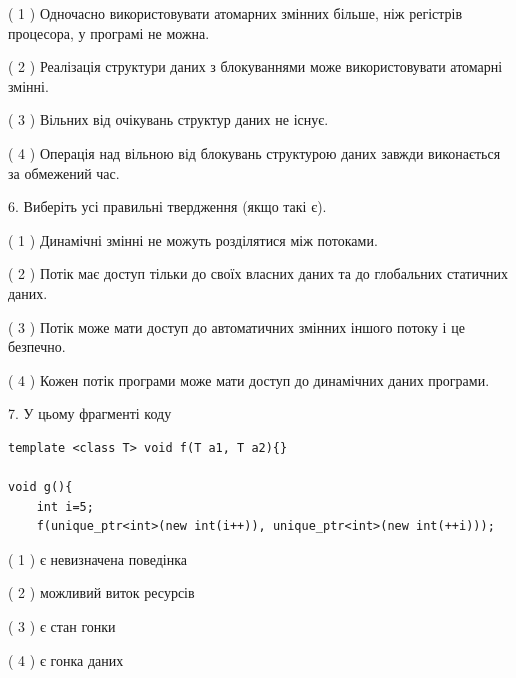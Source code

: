 \documentclass[12pt, ukrainian]{article}
\begin{document}
\begin {large}
{( 1 ) Одночасно використовувати атомарних змінних більше, ніж регістрів процесора, у програмі не можна.%

( 2 ) Реалізація структури даних з блокуваннями може використовувати атомарні змінні.%

( 3 ) Вільних від очікувань структур даних не існує.%

( 4 ) Операція над вільною від блокувань структурою даних завжди виконається за обмежений час.%
\newpage



\vspace{5mm}
6. Виберіть усі правильні твердження (якщо такі є).\par
\vspace{2mm}

( 1 ) Динамічні змінні не можуть розділятися між потоками.%

( 2 ) Потік має доступ тільки до своїх власних даних та до глобальних статичних даних.%

( 3 ) Потік може мати доступ до автоматичних змінних іншого потоку і це безпечно.%

( 4 ) Кожен потік програми може мати доступ до динамічних даних програми.%


\vspace{5mm}
7. У цьому фрагменті коду
\begin{verbatim}
template <class T> void f(T a1, T a2){}

void g(){
    int i=5;
    f(unique_ptr<int>(new int(i++)), unique_ptr<int>(new int(++i)));
\end{verbatim}

( 1 ) є невизначена поведінка%

( 2 ) можливий виток ресурсів%

( 3 ) є стан гонки%

( 4 ) є гонка даних%
}
\end {large}
\end{document}
